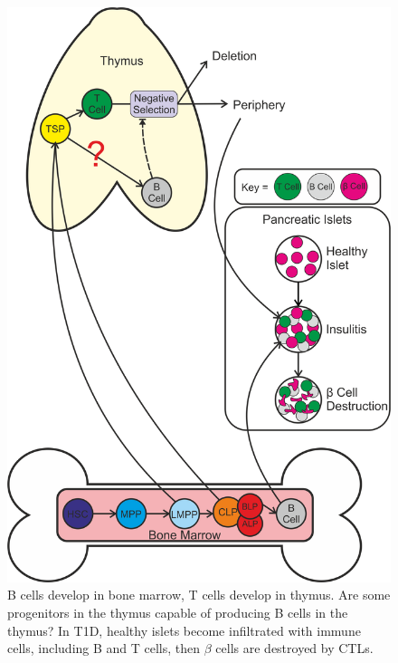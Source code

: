 \begin{figure}
\includegraphics[width=\textwidth]{Figures/Introductorydiagram.png}
\caption{B cells develop in bone marrow, T cells develop in thymus. Are some progenitors in the thymus capable of producing B cells in the thymus?
In T1D, healthy islets become infiltrated with immune cells, including B and T cells, then $\beta$ cells are destroyed by CTLs.}
\label{fig:summarydiagram}
\end{figure}





































